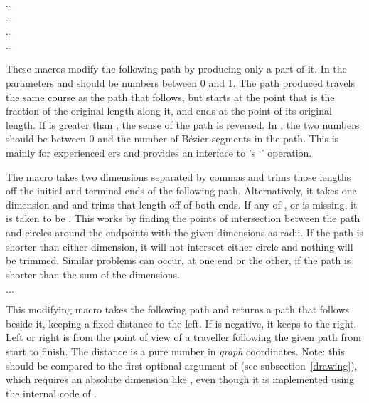 \documentclass[letterpaper]{article}
\begin{document}
\begin{cd}
\dots\\
\dots\\
\dots\\
\dots%
%
%
%
\end{cd}

These macros modify the following path by producing only a part of it. In
 the parameters  and  should be
numbers between 0 and 1. The path produced travels the same course as
the path that follows, but starts at the point that is the fraction
 of the original length along it, and ends at the point
 of its original length. If  is greater than
, the sense of the path is reversed. In , the
two numbers should be between 0 and the number of B\'ezier segments in
the path. This is mainly for experienced \MF{}ers and provides an \mfp{}
interface to \MF{}'s `' operation.

The  macro takes two dimensions separated by commas and
trims those lengths off the initial and terminal ends of the following path.
Alternatively, it takes one dimension and and trims that length off of
both ends. If any of ,  or  is
missing, it is taken to be \dim{0pt}. This works by finding the points of
intersection between the path and circles around the endpoints with the given
dimensions as radii. If the path is shorter than either dimension, it
will not intersect either circle and nothing will be trimmed. Similar
problems can occur, at one end or the other, if the path is shorter than
the sum of the dimensions.

\begin{cd}
$\ldots$
\end{cd}

This modifying macro takes the following path and returns a path that
follows beside it, keeping a fixed distance  to the left. If
 is negative, it keeps to the right. Left or right is from
the point of view of a traveller following the given path from start to
finish. The distance is a pure number in \emph{graph} coordinates. Note:
this should be compared to the first optional argument of
 (see subsection~\ref{drawing}), which requires an
absolute dimension like \dim{2pt}, even though it is implemented using
the internal code of .
\end{document}
